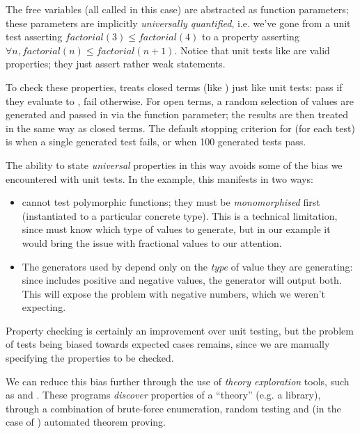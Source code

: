 The free variables (all called  in this case) are abstracted as function parameters; these parameters are implicitly \emph{universally quantified}, i.e. we've gone from a unit test asserting $factorial(3) \leq factorial(4)$ to a property asserting $\forall n, factorial(n) \leq factorial(n+1)$. Notice that unit tests like  are valid properties; they just assert rather weak statements.

To check these properties, \qcheck{} treats closed terms (like ) just like unit tests: pass if they evaluate to , fail otherwise. For open terms, a random selection of values are generated and passed in via the function parameter; the results are then treated in the same way as closed terms. The default stopping criterion for \qcheck{} (for each test) is when a single generated test fails, or when 100 generated tests pass.

The ability to state \emph{universal} properties in this way avoids some of the bias we encountered with unit tests. In the  example, this manifests in two ways:

\begin{itemize}
  \item \qcheck{} cannot test polymorphic functions; they must be \emph{monomorphised} first (instantiated to a particular concrete type). This is a technical limitation, since \qcheck{} must know which type of values to generate, but in our example it would bring the issue with fractional values to our attention.

  \item The generators used by \qcheck{} depend only on the \emph{type} of value they are generating: since  includes positive and negative values, the  generator will output both. This will expose the problem with negative numbers, which we weren't expecting.
\end{itemize}

Property checking is certainly an improvement over unit testing, but the problem of tests being biased towards expected cases remains, since we are manually specifying the properties to be checked.

We can reduce this bias further through the use of \emph{theory exploration} tools, such as \qspec{} and \hspec{}. These programs \emph{discover} properties of a ``theory'' (e.g. a library), through a combination of brute-force enumeration, random testing and (in the case of \hspec{}) automated theorem proving.


